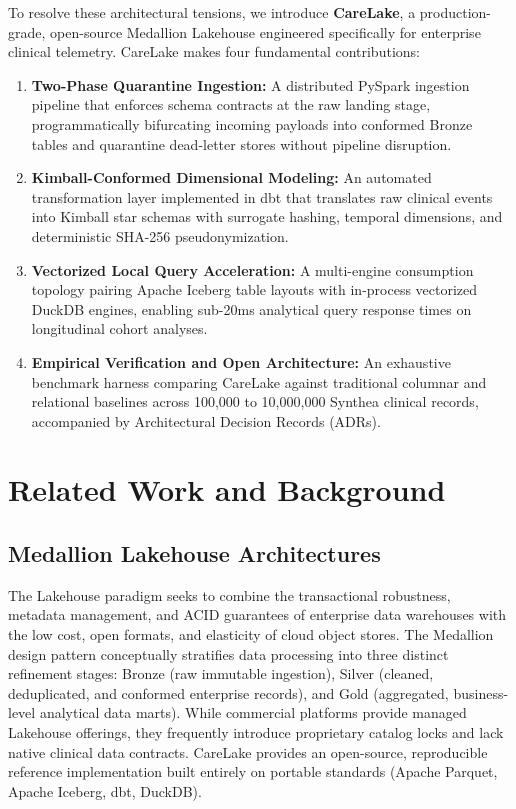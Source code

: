 \documentclass[10pt,journal,compsoc]{IEEEtran}
\begin{document}
To resolve these architectural tensions, we introduce \textbf{CareLake}, a production-grade, open-source Medallion Lakehouse engineered specifically for enterprise clinical telemetry. CareLake makes four fundamental contributions:
\begin{enumerate}
    \item \textbf{Two-Phase Quarantine Ingestion:} A distributed PySpark ingestion pipeline that enforces schema contracts at the raw landing stage, programmatically bifurcating incoming payloads into conformed Bronze tables and quarantine dead-letter stores without pipeline disruption.
    \item \textbf{Kimball-Conformed Dimensional Modeling:} An automated transformation layer implemented in dbt that translates raw clinical events into Kimball star schemas with surrogate hashing, temporal dimensions, and deterministic SHA-256 pseudonymization.
    \item \textbf{Vectorized Local Query Acceleration:} A multi-engine consumption topology pairing Apache Iceberg table layouts with in-process vectorized DuckDB engines, enabling sub-20ms analytical query response times on longitudinal cohort analyses.
    \item \textbf{Empirical Verification and Open Architecture:} An exhaustive benchmark harness comparing CareLake against traditional columnar and relational baselines across 100,000 to 10,000,000 Synthea clinical records, accompanied by Architectural Decision Records (ADRs).
\end{enumerate}

\section{Related Work and Background}
\subsection{Medallion Lakehouse Architectures}
The Lakehouse paradigm seeks to combine the transactional robustness, metadata management, and ACID guarantees of enterprise data warehouses with the low cost, open formats, and elasticity of cloud object stores. The Medallion design pattern conceptually stratifies data processing into three distinct refinement stages: Bronze (raw immutable ingestion), Silver (cleaned, deduplicated, and conformed enterprise records), and Gold (aggregated, business-level analytical data marts). While commercial platforms provide managed Lakehouse offerings, they frequently introduce proprietary catalog locks and lack native clinical data contracts. CareLake provides an open-source, reproducible reference implementation built entirely on portable standards (Apache Parquet, Apache Iceberg, dbt, DuckDB).
\end{document}
